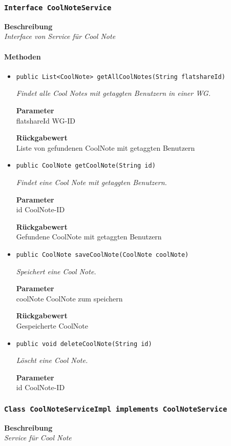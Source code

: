      \subsubsection{\texttt{Interface CoolNoteService}}
     \textbf{Beschreibung} \\
     \textit{Interface von Service für Cool Note}
     \paragraph*{Methoden}
     \begin{itemize}
     	\item{\texttt{public List<CoolNote> getAllCoolNotes(String flatshareId)}}
     	
     	\textit{Findet alle Cool Notes mit getaggten Benutzern in einer WG.}
     	
     	\textbf{Parameter} \\
     	flatshareId WG-ID
     	
     	\textbf{Rückgabewert} \\
     	Liste von gefundenen CoolNote mit getaggten Benutzern        \item{\texttt{public CoolNote getCoolNote(String id)}}
     	
     	\textit{Findet eine Cool Note mit getaggten Benutzern.}
     	
     	\textbf{Parameter} \\
     	id CoolNote-ID
     	
     	\textbf{Rückgabewert} \\
     	Gefundene CoolNote mit getaggten Benutzern        \item{\texttt{public CoolNote saveCoolNote(CoolNote coolNote)}}
     	
     	\textit{Speichert eine Cool Note.}
     	
     	\textbf{Parameter} \\
     	coolNote CoolNote zum speichern
     	
     	\textbf{Rückgabewert} \\
     	Gespeicherte CoolNote        \item{\texttt{public void deleteCoolNote(String id)}}
     	
     	\textit{Löscht eine Cool Note.}
     	
     	\textbf{Parameter} \\
     	id CoolNote-ID
     	
     	
     \end{itemize}
     \subsubsection{\texttt{Class CoolNoteServiceImpl implements CoolNoteService}}
     \textbf{Beschreibung} \\
     \textit{Service für Cool Note}
